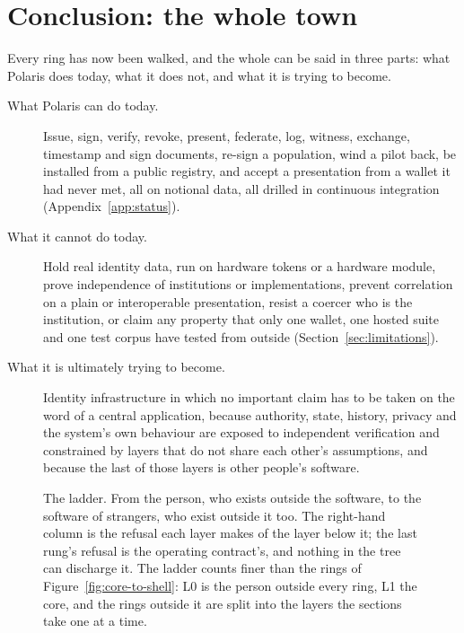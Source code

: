 \section{Conclusion: the whole town}
\label{sec:conclusion}

Every ring has now been walked, and the whole can be said in three parts: what Polaris does today, what it does not, and what it is trying to become.

\begin{description}
  \item[What Polaris can do today.] Issue, sign, verify, revoke, present, federate, log, witness,
    exchange, timestamp and sign documents, re-sign a population, wind a pilot back, be installed from
    a public registry, and accept a presentation from a wallet it had never met, all on notional
    data, all drilled in continuous integration (Appendix~\ref{app:status}).
  \item[What it cannot do today.] Hold real identity data, run on hardware tokens or a hardware
    module, prove independence of institutions or implementations, prevent correlation on a plain or
    interoperable presentation, resist a coercer who is the institution, or claim any property that
    only one wallet, one hosted suite and one test corpus have tested from outside
    (Section~\ref{sec:limitations}).
  \item[What it is ultimately trying to become.] Identity infrastructure in which no important claim
    has to be taken on the word of a central application, because authority, state, history, privacy
    and the system's own behaviour are exposed to independent verification and constrained by layers
    that do not share each other's assumptions, and because the last of those layers is other
    people's software.
\end{description}

\begin{figure}[H]\centering
  \caption{The ladder. From the person, who exists outside the software, to the
software of strangers, who exist outside it too. The right-hand column is the refusal each layer
makes of the layer below it; the last rung's refusal is the operating contract's, and nothing in
the tree can discharge it. The ladder counts finer than the rings of
Figure~\ref{fig:core-to-shell}: L0 is the person outside every ring, L1 the core, and the rings
outside it are split into the layers the sections take one at a time.}\label{fig:layer-ladder}\end{figure}

